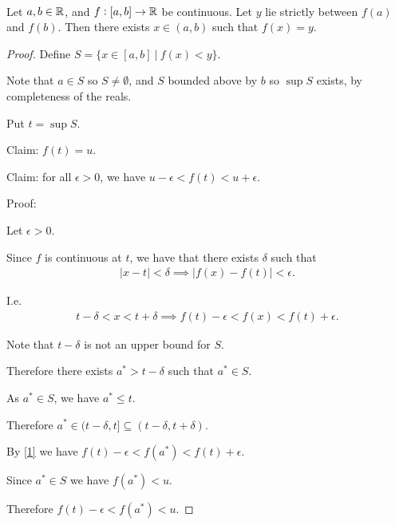 \documentclass[12pt]{article}
\begin{document}
\begin{theorem*}~\\
  Let $a, b \in \mathbb{R}$, and $f:[a, b] \to \mathbb{R}$ be continuous. Let $y$ lie strictly between $f(a)$ and
  $f(b)$. Then there exists $x \in (a, b)$ such that $f(x) = y$.
\end{theorem*}

\begin{proof}

  Define $S = \{x \in [a, b] ~|~ f(x) < y\}$.

  Note that $a \in S$ so $S \neq \emptyset$, and $S$ bounded above by $b$ so $\sup S$ exists, by
  completeness of the reals.

  Put $t = \sup S$.

  Claim: $f(t) = u$.




  Claim: for all $\epsilon > 0$, we have $u - \epsilon < f(t) < u + \epsilon$.

  Proof:

  Let $\epsilon > 0$.

  Since $f$ is continuous at $t$, we have that there exists $\delta$ such that
  \begin{align} \label{1}
    |x - t| < \delta \implies |f(x) - f(t)| < \epsilon.
  \end{align}

  I.e.
  \begin{align*}
    t - \delta < x < t + \delta \implies f(t) - \epsilon < f(x) < f(t) + \epsilon.
  \end{align*}

  Note that $t - \delta$ is not an upper bound for $S$.

  Therefore there exists $a^* > t - \delta$ such that $a^* \in S$.

  As $a^* \in S$, we have $a^* \leq t$.

  Therefore $a^* \in (t - \delta, t] \subseteq (t - \delta, t + \delta)$.

  By \eqref{1} we have $f(t) - \epsilon < f(a^*) < f(t) + \epsilon$.

  Since $a^* \in S$ we have $f(a^*) < u$.

  Therefore $f(t) - \epsilon < f(a^*) < u$.


\end{proof}
\end{document}
